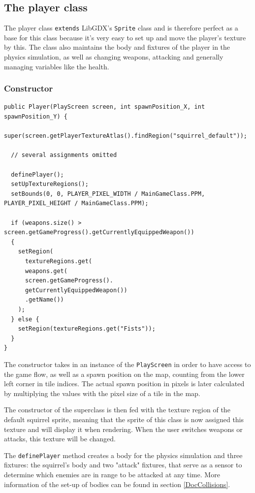 \documentclass[12p]{article}
\begin{document}

\newpage
\subsection{The player class} \label{DocPlayerClass}

The player class \texttt{extends} LibGDX's \texttt{Sprite} class and is therefore perfect as a base for this class because it's very easy to set up and move the player's texture by this. The class also maintains the body and fixtures of the player in the physics simulation, as well as changing weapons, attacking and generally managing variables like the health.

\subsubsection{Constructor}

\begin{verbatim}
public Player(PlayScreen screen, int spawnPosition_X, int spawnPosition_Y) {
  super(screen.getPlayerTextureAtlas().findRegion("squirrel_default"));
  
  // several assignments omitted

  definePlayer();
  setUpTextureRegions();
  setBounds(0, 0, PLAYER_PIXEL_WIDTH / MainGameClass.PPM, PLAYER_PIXEL_HEIGHT / MainGameClass.PPM);

  if (weapons.size() > screen.getGameProgress().getCurrentlyEquippedWeapon()) 
  {
    setRegion(
      textureRegions.get(
      weapons.get(
      screen.getGameProgress().
      getCurrentlyEquippedWeapon())
      .getName())
    );
  } else {
    setRegion(textureRegions.get("Fists"));
  }
}
\end{verbatim}

The constructor takes in an instance of the \texttt{PlayScreen} in order to have access to the game flow, as well as a spawn position on the map, counting from the lower left corner in tile indices. The actual spawn position in pixels is later calculated by multiplying the values with the pixel size of a tile in the map.

The constructor of the superclass is then fed with the texture region of the default squirrel sprite, meaning that the sprite of this class is now assigned this texture and will display it when rendering. When the user switches weapons or attacks, this texture will be changed. 

The \texttt{definePlayer} method creates a body for the physics simulation and three fixtures: the squirrel's body and two "attack" fixtures, that serve as a sensor to determine which enemies are in range to be attacked at any time. More information of the set-up of bodies can be found in section \ref{DocCollisions}.
\end{document}
